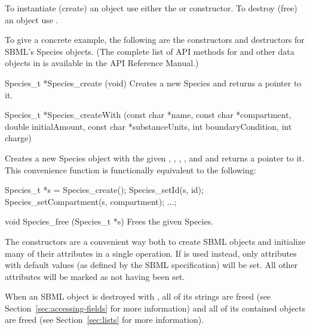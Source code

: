 \documentclass{sbmlmanual}
\begin{document}
To instantiate (create) an object use either the
 or  constructor.  To
destroy (free) an object use .

To give a concrete example, the following are the constructors and
destructors for SBML's Species objects.  (The complete list of API methods
for  and other data objects in \libsbml{} is available in
the \libsbml{} API Reference Manual.)


\begin{methoddef}{Species\_t *Species\_create (void)}
  Creates a new Species and returns a pointer to it.
\end{methoddef}

\begin{methoddef}{Species\_t *Species\_createWith (const char *name,
    const char *compartment,\\ double initialAmount, const char *substanceUnits,
    int boundaryCondition, int charge)}
  
  Creates a new Species object with the given ,
  , ,
  ,  and
   and returns a pointer to it.  This convenience function
  is functionally equivalent to the following:
  \begin{example}[c]
Species_t *s = Species_create();
Species_setId(s, id); Species_setCompartment(s, compartment); ...;
  \end{example}
\end{methoddef}

\begin{methoddef}{void Species\_free (Species\_t *s)}
  Frees the given Species.
\end{methoddef}


The  constructors are a convenient way both to
create SBML objects and initialize many of their attributes in a single
operation.  If  is used instead, only attributes with
default values (as defined by the SBML specification) will be set.  All
other attributes will be marked as not having been set.

When an SBML object is destroyed with , all of its
strings are freed (see Section~\ref{sec:accessing-fields} for more
information) and all of its contained objects are freed (see
Section~\ref{sec:lists} for more information).


\end{document}
